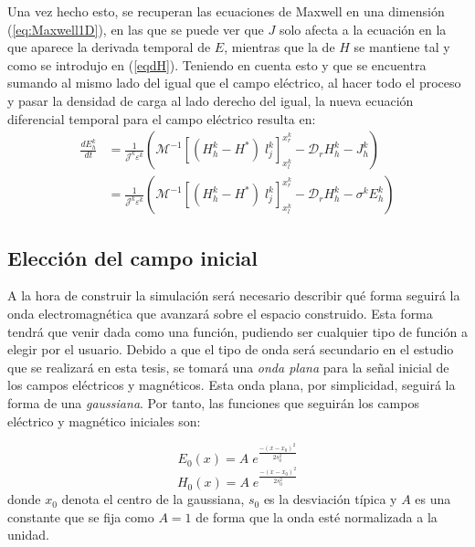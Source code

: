 \documentclass[11pt,a4paper,twoside,pdf]{article}
\numberwithin{equation}{section}
\begin{document}
Una vez hecho esto, se recuperan las ecuaciones de Maxwell en una dimensión (\ref{eq:Maxwell1D}), en las que se puede ver que $J$ solo afecta a la ecuación en la que aparece la derivada temporal de $E$, mientras que la de $H$ se mantiene tal y como se introdujo en (\ref{eqdH}). Teniendo en cuenta esto y que se encuentra sumando al mismo lado del igual que el campo eléctrico, al hacer todo el proceso y pasar la densidad de carga al lado derecho del igual, la nueva ecuación diferencial temporal para el campo eléctrico resulta en:
\begin{equation}
\begin{aligned}
\frac{dE_h^k}{dt} &= \frac{1}{\mathcal{J}^k\varepsilon^k}\left(\mathcal{M}^{-1}\left[(H^k_h - H^*)\;l_j^k\right]^{x_r^k}_{x_l^k} - \mathcal{D}_r H^k_h - J^k_h\right) \\
                  &= \frac{1}{\mathcal{J}^k\varepsilon^k}\left(\mathcal{M}^{-1}\left[(H^k_h - H^*)\;l_j^k\right]^{x_r^k}_{x_l^k} - \mathcal{D}_r H^k_h - \sigma^kE^k_h\right) 
\end{aligned}
\end{equation}

\subsection{Elección del campo inicial} \label{subsection34}
A la hora de construir la simulación será necesario describir qué forma seguirá la onda electromagnética que avanzará sobre el espacio construido.  Esta forma tendrá que venir dada como una función, pudiendo ser cualquier tipo de función a elegir por el usuario. Debido a que el tipo de onda será secundario en el estudio que se realizará en esta  tesis, se tomará una \textit{onda plana} para la señal inicial de los campos eléctricos y magnéticos. Esta onda plana, por simplicidad, seguirá la forma de una \textit{gaussiana}. Por tanto, las funciones que seguirán los campos eléctrico y magnético iniciales son:

\begin{equation}
        E_0(x) = A\;e^{\frac{-(x-x_0)^2}{2s_0^2}} \label{gauss1}
\end{equation}
\begin{equation}
        H_0(x) = A\;e^{\frac{-(x-x_0)^2}{2s_0^2}} \label{gauss2}
\end{equation}
donde $x_0$ denota el centro de la gaussiana, $s_0$ es la desviación típica y $A$ es una constante que se fija como $A=1$ de forma que la onda esté normalizada a la unidad.
\end{document}
